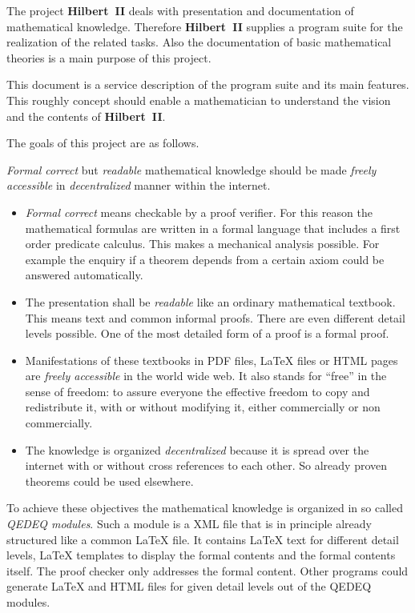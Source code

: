 \documentclass[a4paper,german,10pt,twoside]{book}
\theoremstyle{definition}
\theoremstyle{remark}
\begin{document}
The project \textbf{Hilbert~II} deals with presentation and documentation of mathematical knowledge. Therefore \textbf{Hilbert~II} supplies a program suite for the realization of the related tasks. Also the documentation of basic mathematical theories is a main purpose of this project.
\par
This document is a service description of the program suite and its main features. This roughly concept should enable a mathematician to understand the vision and the contents of \textbf{Hilbert~II}.
\par
The goals of this project are as follows.
\par
\emph{Formal correct} but \emph{readable} mathematical knowledge should be made \emph{freely accessible} in \emph{decentralized} manner within the internet.
\begin{itemize}
\item
\emph{Formal correct} means checkable by a proof verifier. For this reason the mathematical formulas are written in a formal language that includes a first order predicate calculus. This makes a mechanical analysis possible. For example the enquiry if a theorem depends from a certain axiom could be answered automatically.
\item
The presentation shall be \emph{readable} like an ordinary mathematical textbook. This means text and common informal proofs. There are even different detail levels possible. One of the most detailed form of a proof is a formal proof.
\item
Manifestations of these textbooks in PDF files, \LaTeX{} files or HTML pages are \emph{freely accessible} in the world wide web. It also stands for ``free'' in the sense of freedom: to assure everyone the effective freedom to copy and redistribute it, with or without modifying it, either commercially or non commercially.
\item
The knowledge is organized \emph{decentralized} because it is spread over the internet with or without cross references to each other. So already proven theorems could be used elsewhere.
\end{itemize}
To achieve these objectives the mathematical knowledge is organized in so called \emph{QEDEQ modules}. Such a module is a XML file that is in principle already structured like a common \LaTeX{} file. It contains \LaTeX{} text for different detail levels, \LaTeX{} templates to display the formal contents and the formal contents itself. The proof checker only addresses the formal content. Other programs could generate \LaTeX{} and HTML files for given detail levels out of the QEDEQ modules. 
\end{document}
